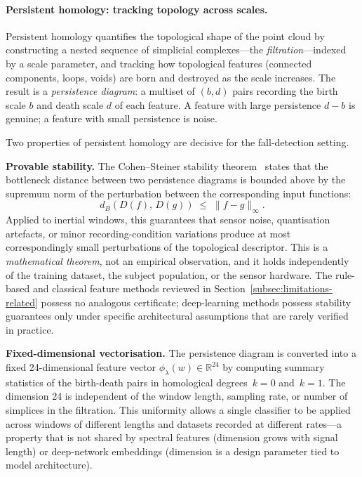 \documentclass[onluarkali,ingilizce,yukseklisans,karton,LisansustuEgitim]{itutez}
\providecommand{\R}{\mathbb{R}}
\providecommand{\1}{\mathbf{1}}
\begin{document}
\paragraph{Persistent homology: tracking topology across scales.}
Persistent homology quantifies the topological shape of the point cloud by constructing a nested sequence of simplicial complexes---the \emph{filtration}---indexed by a scale parameter, and tracking how topological features (connected components, loops, voids) are born and destroyed as the scale increases. The result is a \emph{persistence diagram}: a multiset of $(b,d)$ pairs recording the birth scale $b$ and death scale $d$ of each feature. A feature with large persistence $d-b$ is genuine; a feature with small persistence is noise.

Two properties of persistent homology are decisive for the fall-detection setting.

\textbf{Provable stability.}  The Cohen--Steiner stability theorem~\parencite{cohen2007stability}
states that the bottleneck distance between two persistence diagrams is bounded above
by the supremum norm of the perturbation between the corresponding input functions:
\[
  d_B(D(f),\,D(g)) \;\leq\; \|f - g\|_\infty.
\]
Applied to inertial windows, this guarantees that sensor noise, quantisation artefacts, or minor recording-condition variations produce at most correspondingly small perturbations of the topological descriptor. This is a \emph{mathematical theorem}, not an empirical observation, and it holds independently of the training dataset, the subject population, or the sensor hardware. The rule-based and classical feature methods reviewed in Section~\ref{subsec:limitations-related} possess no analogous certificate; deep-learning methods possess stability guarantees only under specific architectural assumptions that are rarely verified in practice.

\textbf{Fixed-dimensional vectorisation.}  The persistence diagram is converted into
a fixed 24-dimensional feature vector $\phi_\lambda(w)\in\R^{24}$ by computing
summary statistics of the birth-death pairs in homological degrees~$k=0$ and~$k=1$.
The dimension 24 is independent of the window length, sampling rate, or number of
simplices in the filtration.  This uniformity allows a single classifier to be applied
across windows of different lengths and datasets recorded at different rates---a
property that is not shared by spectral features (dimension grows with signal length)
or deep-network embeddings (dimension is a design parameter tied to model architecture).
\end{document}
